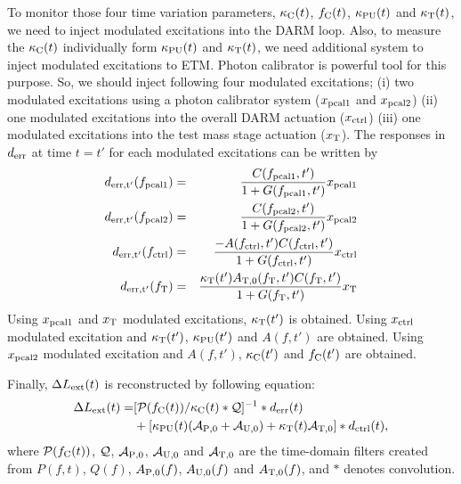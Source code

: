 To monitor those four time variation parameters, 
$\kappa_{\rm C}(t)$, $f_{\rm C}(t)$, $\kappa_{\rm PU}(t)$ and $\kappa_{\rm T}(t)$, 
we need to inject modulated excitations into the DARM loop.
Also, to measure the $\kappa_{\rm C}(t)$ individually form $\kappa_{\rm PU}(t)$ and $\kappa_{\rm T}(t)$,
we need additional system to inject modulated excitations to ETM.
Photon calibrator is powerful tool for this purpose.
So, we should inject following four modulated excitations;
(i) two modulated excitations using a photon calibrator system ($x_{\rm pcal1}$ and $x_{\rm pcal2}$)
(ii) one modulated excitations into the overall DARM actuation ($x_{\rm ctrl}$)
(iii) one modulated excitations into the test mass stage actuation ($x_{\rm T}$).
The responses in $d_{\rm err}$ at time $t=t'$ for each modulated excitations can be written by
\begin{eqnarray}
d_{\rm err, t'}(f_{\rm pcal1}) &=& \frac{C(f_{\rm pcal1},t')}{1+G(f_{\rm pcal1},t')} x_{\rm pcal1} \\
d_{\rm err, t'}(f_{\rm pcal2}) &=& \frac{C(f_{\rm pcal2},t')}{1+G(f_{\rm pcal2},t')} x_{\rm pcal2} \\
d_{\rm err, t'}(f_{\rm ctrl}) &=& \frac{-A(f_{\rm ctrl}, t')C(f_{\rm ctrl},t')}{1+G(f_{\rm ctrl},t')} x_{\rm ctrl}  \\
d_{\rm err, t'}(f_{\rm T}) &=& \frac{\kappa_{\rm T}(t') A_{\rm T,0}(f_{\rm T}, t')C(f_{\rm T},t')}{1+G(f_{\rm T},t')} x_{\rm T} 
\end{eqnarray}
Using $x_{\rm pcal1}$ and $x_{\rm T}$ modulated excitations, $\kappa_{\rm T}(t')$ is obtained.
Using $x_{\rm ctrl}$ modulated excitation and $\kappa_{\rm T}(t')$, $\kappa_{\rm PU}(t')$ and $A(f,t')$ are obtained. 
Using $x_{\rm pcal2}$ modulated excitation and $A(f,t')$, $\kappa_{\rm C}(t')$ and $f_{\rm C}(t')$ are obtained.

Finally, $\Delta L_{\rm ext}(t)$ is reconstructed by following equation:
\begin{eqnarray}
\Delta L_{\rm ext}(t) = &[{\cal P}(f_{\rm C}(t))/ \kappa_{\rm C}(t) * {\cal Q} ]^{-1} * d_{\rm err}(t) \nonumber \\
& + [ 
  \kappa_{\rm PU}(t)({\cal A}_{\rm P,0} + {\cal A}_{\rm U,0}) + \kappa_{\rm T}(t) {\cal A}_{\rm T,0}  
]
* d_{\rm ctrl}(t),
\end{eqnarray}
where ${\cal P}(f_{\rm C}(t))$, ${\cal Q}$, ${\cal A_{\rm P,0}}$, ${\cal A_{\rm U,0}}$ and ${\cal A_{\rm T,0}}$  
are the time-domain filters created from $P(f,t)$, $Q(f)$, $A_{\rm P,0}(f)$, $A_{\rm U,0}(f)$ and $A_{\rm T,0}(f)$, and $*$ denotes convolution.

